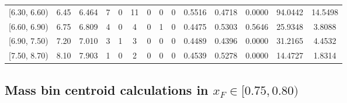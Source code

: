 \begin{table}[htbp]
{\begin{tabular}{cc|c|cccccc|ccc|cc}
        {[6.30, 6.60)} & 6.45 & 6.464 & 7 & 0 & 11 & 0 & 0 & 0 & 0.5516 & 0.4718 & 0.0000 & 94.0442 & 14.5498 \\
        {[6.60, 6.90)} & 6.75 & 6.809 & 4 & 0 & 4 & 0 & 1 & 0 & 0.4475 & 0.5303 & 0.5646 & 25.9348 & 3.8088 \\
        {[6.90, 7.50)} & 7.20 & 7.010 & 3 & 1 & 3 & 0 & 0 & 0 & 0.4489 & 0.4396 & 0.0000 & 31.2165 & 4.4532 \\
        {[7.50, 8.70)} & 8.10 & 7.903 & 1 & 0 & 2 & 0 & 0 & 0 & 0.4539 & 0.5278 & 0.0000 & 14.4727 & 1.8314 \\
        \hline\hline
    \end{tabular}
    }
\end{table}

\clearpage
\subsection{\texorpdfstring{Mass bin centroid calculations in $x_F \in [0.75, 0.80)$}{Mass bin centroid calculations in x\_F in [0.75, 0.80)]}}

